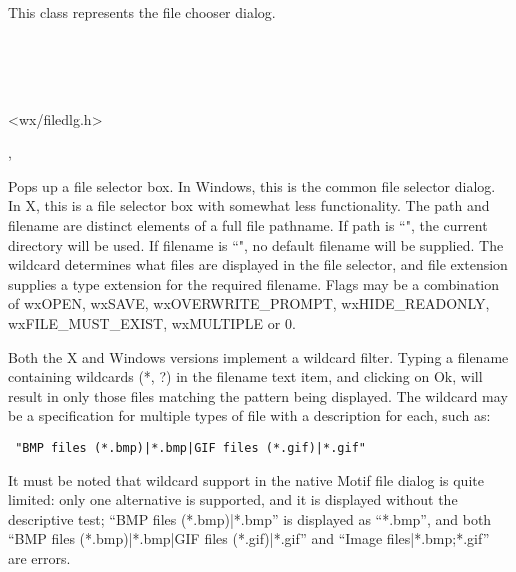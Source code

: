\section{}\label{wxfiledialog}

This class represents the file chooser dialog.


\\
\\
\\


<wx/filedlg.h>


, 


Pops up a file selector box. In Windows, this is the common file selector
dialog. In X, this is a file selector box with somewhat less functionality.
The path and filename are distinct elements of a full file pathname.
If path is ``", the current directory will be used. If filename is ``",
no default filename will be supplied. The wildcard determines what files
are displayed in the file selector, and file extension supplies a type
extension for the required filename. Flags may be a combination of wxOPEN,
wxSAVE, wxOVERWRITE\_PROMPT, wxHIDE\_READONLY, wxFILE\_MUST\_EXIST, wxMULTIPLE or 0.

Both the X and Windows versions implement a wildcard filter. Typing a
filename containing wildcards (*, ?) in the filename text item, and
clicking on Ok, will result in only those files matching the pattern being
displayed. The wildcard may be a specification for multiple
types of file with a description for each, such as:

\begin{verbatim}
 "BMP files (*.bmp)|*.bmp|GIF files (*.gif)|*.gif"
\end{verbatim}

It must be noted that wildcard support in the native Motif file
dialog is quite limited: only one alternative is supported,
and it is displayed without the descriptive test; ``BMP files (*.bmp)|*.bmp''
is displayed as ``*.bmp'', and both
``BMP files (*.bmp)|*.bmp|GIF files (*.gif)|*.gif'' and
``Image files|*.bmp;*.gif'' are errors.

